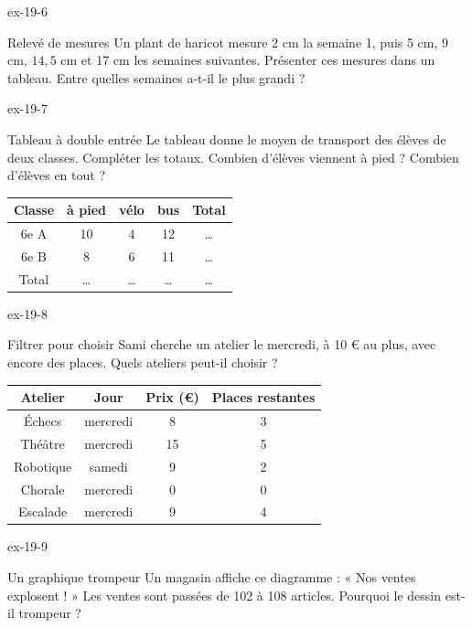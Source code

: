 \begin{blocLivre}{ex-19-6}\begin{exercice}[2]{Relevé de mesures}
Un plant de haricot mesure 2 cm la semaine 1, puis 5 cm, $9$ cm, $14{,}5$ cm et 17 cm les semaines suivantes. Présenter ces mesures dans un tableau. Entre quelles semaines a-t-il le plus grandi ?
\end{exercice}\end{blocLivre}
\begin{blocLivre}{ex-19-7}\begin{exercice}[2]{Tableau à double entrée}
Le tableau donne le moyen de transport des élèves de deux classes. Compléter les totaux. Combien d’élèves viennent à pied ? Combien d’élèves en tout ?\begin{center}\renewcommand{\arraystretch}{1.35}\begin{tabular}{c|cccc}\toprule
Classe & à pied & vélo & bus & Total\\\midrule
6e A & 10 & 4 & 12 & …\\
6e B & 8 & 6 & 11 & …\\
Total & … & … & … & …\\
\bottomrule\end{tabular}\end{center}
\end{exercice}\end{blocLivre}
\begin{blocLivre}{ex-19-8}\begin{exercice}[2]{Filtrer pour choisir}
Sami cherche un atelier le mercredi, à 10 € au plus, avec encore des places. Quels ateliers peut-il choisir ?\begin{center}\renewcommand{\arraystretch}{1.35}\begin{tabular}{c|ccc}\toprule
Atelier & Jour & Prix (€) & Places restantes\\\midrule
Échecs & mercredi & 8 & 3\\
Théâtre & mercredi & 15 & 5\\
Robotique & samedi & 9 & 2\\
Chorale & mercredi & 0 & 0\\
Escalade & mercredi & 9 & 4\\
\bottomrule\end{tabular}\end{center}
\end{exercice}\end{blocLivre}
\begin{blocLivre}{ex-19-9}\begin{exercice}[2]{Un graphique trompeur}
Un magasin affiche ce diagramme : « Nos ventes explosent ! » Les ventes sont passées de 102 à 108 articles. Pourquoi le dessin est-il trompeur ?
\label{fig-ex-19-9}
\end{exercice}\end{blocLivre}
